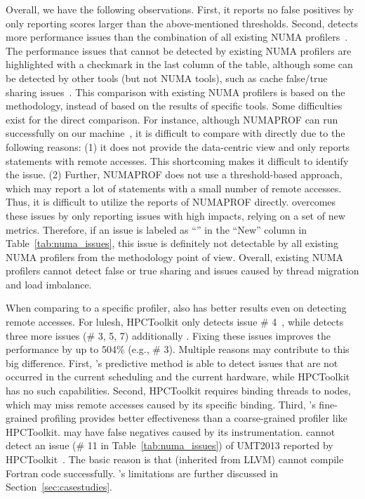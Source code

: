 Overall, we have the following observations. First, it reports no false positives by only reporting scores larger than the above-mentioned thresholds. Second, \NP{} 
detects more performance issues than the combination of all existing NUMA profilers~\cite{Intel:VTune, Memphis, Lachaize:2012:MMP:2342821.2342826, XuNuma, NumaMMA, 7847070, diener2015characterizing, valat:2018:numaprof}. The performance issues that cannot be detected by existing NUMA profilers are highlighted with a checkmark in the last column of the table, although some can be detected by other  tools (but not NUMA tools), such as cache false/true sharing issues~\cite{Sheriff, Predator, Cheetah, DBLP:conf/ppopp/ChabbiWL18, helm2019perfmemplus}. This comparison with existing NUMA profilers is based on the methodology, instead of based on the results of specific tools. Some difficulties exist for the direct comparison. For instance, although  NUMAPROF can run successfully on our machine~\cite{valat:2018:numaprof}, it is  difficult to compare with directly due to the following reasons: (1) it does not provide the data-centric view and only reports statements with remote accesses. This shortcoming makes it difficult to identify the issue. (2) Further, NUMAPROF does not use a threshold-based approach, which may report a lot of statements with a small number of remote accesses. Thus, it is difficult to utilize the reports of NUMAPROF directly. \NP{} overcomes these issues by only reporting issues with high impacts, relying on a set of new metrics. Therefore, if an issue is labeled as ``\checkmark'' in the ``New'' column in Table~\ref{tab:numa_issues}, this issue is definitely not detectable by all existing NUMA profilers from the methodology point of view. Overall, existing NUMA profilers cannot detect false or true sharing and issues caused by thread migration and load imbalance. 

When comparing to a specific profiler, \NP{} also has better results even on detecting remote accesses. For lulesh, HPCToolkit only detects issue \# 4~\cite{XuNuma}, while \NP{} detects three more issues (\# 3, 5, 7) additionally . Fixing these issues improves the performance by up to 504\% (e.g., \# 3). Multiple reasons may contribute to this big difference. 
First, \NP{}'s predictive method is able to  detect issues that are not occurred in the current scheduling and the current hardware, while HPCToolkit has no such capabilities. Second, HPCToolkit requires binding threads to nodes, which may miss remote accesses caused by its specific binding. 
Third, \NP{}'s fine-grained profiling provides  better effectiveness than a coarse-grained profiler like HPCToolkit. 
\NP{} may have false negatives caused by its instrumentation. \NP{} cannot detect an issue (\# 11 in Table~\ref{tab:numa_issues}) of UMT2013 reported by HPCToolkit~\cite{XuNuma}. The basic reason is that \NP{} (inherited from LLVM) cannot compile Fortran code successfully. \NP{}'s limitations are further discussed in Section~\ref{sec:casestudies}.



